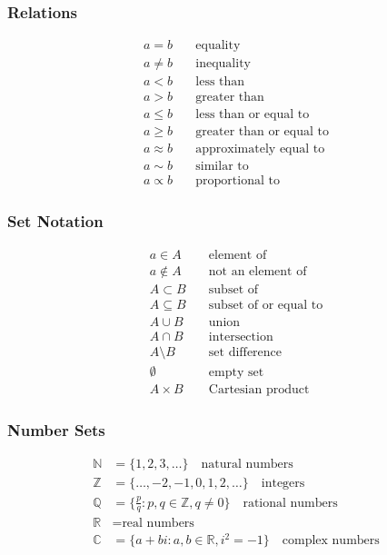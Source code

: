 \documentclass[11pt,a4paper]{article}
\newcommand{\R}{\mathbb{R}}         %
\newcommand{\Z}{\mathbb{Z}}         %
\newcommand{\N}{\mathbb{N}}         %
\newcommand{\Q}{\mathbb{Q}}         %
\newcommand{\C}{\mathbb{C}}         %
\begin{document}
\subsubsection{Relations}
\begin{align}
    a = b &\quad \text{equality} \\
    a \neq b &\quad \text{inequality} \\
    a < b &\quad \text{less than} \\
    a > b &\quad \text{greater than} \\
    a \leq b &\quad \text{less than or equal to} \\
    a \geq b &\quad \text{greater than or equal to} \\
    a \approx b &\quad \text{approximately equal to} \\
    a \sim b &\quad \text{similar to} \\
    a \propto b &\quad \text{proportional to}
\end{align}

\subsubsection{Set Notation}
\begin{align}
    a \in A &\quad \text{element of} \\
    a \notin A &\quad \text{not an element of} \\
    A \subset B &\quad \text{subset of} \\
    A \subseteq B &\quad \text{subset of or equal to} \\
    A \cup B &\quad \text{union} \\
    A \cap B &\quad \text{intersection} \\
    A \setminus B &\quad \text{set difference} \\
    \emptyset &\quad \text{empty set} \\
    A \times B &\quad \text{Cartesian product}
\end{align}

\subsubsection{Number Sets}
\begin{align}
    \N &= \{1, 2, 3, \ldots\} \quad \text{natural numbers} \\
    \Z &= \{\ldots, -2, -1, 0, 1, 2, \ldots\} \quad \text{integers} \\
    \Q &= \{\frac{p}{q} : p, q \in \Z, q \neq 0\} \quad \text{rational numbers} \\
    \R &= \text{real numbers} \\
    \C &= \{a + bi : a, b \in \R, i^2 = -1\} \quad \text{complex numbers}
\end{align}
\end{document}
